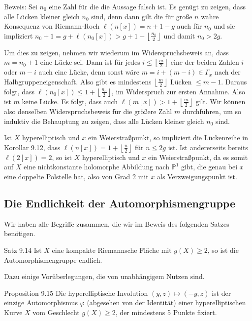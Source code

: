 \documentclass[10pt, letterpaper]{article}
\begin{document}
Beweis: Sei $n_{0}$ eine Zahl für die die Aussage falsch ist. Es genügt zu zeigen, dass alle Lücken kleiner gleich $n_{0}$ sind, denn dann gilt die für große $n$ wahre Konsequenz von Riemann-Roch $\ell(n[x])=n+1-g$ auch für $n_{0}$ und sie impliziert $n_{0}+1=g+\ell\left(n_{0}[x]\right)>g+1+\left\lfloor\frac{n_{0}}{2}\right\rfloor$ und damit $n_{0}>2 g$.

Um dies zu zeigen, nehmen wir wiederum im Widerspruchsbeweis an, dass $m=n_{0}+1$ eine Lücke sei. Dann ist für jedes $i \leq\left\lfloor\frac{m}{2}\right\rfloor$ eine der beiden Zahlen $i$ oder $m-i$ auch eine Lücke, denn sonst wäre $m=i+(m-i) \in \Gamma_{x}$ nach der Halbgruppeneigenschaft. Also gibt es mindestens $\left\lfloor\frac{m}{2}\right\rfloor$ Lücken $\leq m-1$. Daraus folgt, dass $\ell\left(n_{0}[x]\right) \leq 1+\left\lfloor\frac{n_{0}}{2}\right\rfloor$, im Widerspruch zur ersten Annahme. Also ist $m$ keine Lücke. Es folgt, dass auch $\ell(m[x])>1+\left\lfloor\frac{m}{2}\right\rfloor$ gilt. Wir können also denselben Widerspruchsbeweis für die größere Zahl $m$ durchführen, um so induktiv die Behauptung zu zeigen, dass alle Lücken kleiner gleich $n_{0}$ sind.

Ist $X$ hyperelliptisch und $x$ ein Weierstraßpunkt, so impliziert die Lückenreihe in Korollar 9.12, dass $\ell(n[x])=1+\left\lfloor\frac{n}{2}\right\rfloor$ für $n \leq 2 g$ ist. Ist andererseits bereits $\ell(2[x])=2$, so ist $X$ hyperelliptisch und $x$ ein Weierstraßpunkt, da es somit auf $X$ eine nichtkonstante holomorphe Abbildung nach $\mathbb{P}^{1}$ gibt, die genau bei $x$ eine doppelte Polstelle hat, also von Grad 2 mit $x$ als Verzweigungspunkt ist.

\subsection {Die Endlichkeit der Automorphismengruppe}
Wir haben alle Begriffe zusammen, die wir im Beweis des folgenden Satzes benötigen.

Satz 9.14 Ist $X$ eine kompakte Riemannsche Fläche mit $g(X) \geq 2$, so ist die Automorphismengruppe endlich.

Dazu einige Vorüberlegungen, die von unabhängigem Nutzen sind.

Proposition 9.15 Die hyperelliptische Involution $(y, z) \longmapsto(-y, z)$ ist der einzige Automorphismus $\varphi$ (abgesehen von der Identität) einer hyperelliptischen Kurve $X$ vom Geschlecht $g(X) \geq 2$, der mindestens 5 Punkte fixiert.
\end{document}
